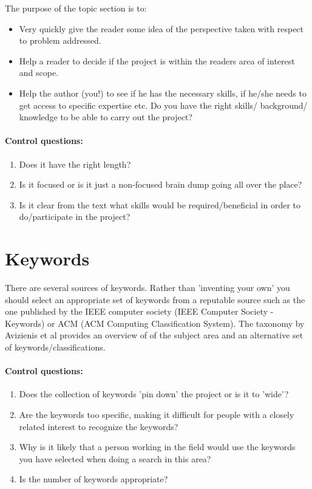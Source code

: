 \documentclass[gjovik]{gucmasterproject}
\begin{document}
The purpose of the topic section is to:
\begin{itemize}
\item Very quickly give the reader some idea of the perspective taken
with respect to problem addressed.  
\item Help a reader to decide if the project
is within the readers area of interest and scope.
\item Help the author (you!) to see if he has the necessary skills,
if he/she needs to get access to specific expertise etc.
Do you have the right skills/ background/ knowledge
to be able to carry out the project?
\end{itemize}

\paragraph{Control questions:}
\begin{enumerate}
\item Does it have the right length?
\item Is it focused or is it just a non-focused brain dump going all over the place?
\item Is it clear from the text what skills would be required/beneficial in order to do/participate in the project?
\end{enumerate}


\section{Keywords}
There are several sources of keywords. Rather than 'inventing your own' you should select an appropriate set of keywords from a reputable source such as the one published by the IEEE computer society (IEEE Computer Society - Keywords) or ACM (ACM Computing Classification System).
The taxonomy by Avizienis et al\cite{Avizienis2004} provides an overview of of the subject area and an alternative set of keywords/classifications.

\paragraph{Control questions:}
\begin{enumerate}
\item Does the collection of keywords 'pin down' the project or is it to 'wide'?
\item Are the keywords too specific, making it difficult  for people with a closely related interest to recognize the keywords?
\item Why is it likely that a person working in the field would use the keywords you have selected when doing a search in this area?
\item Is the number of keywords appropriate?
\end{enumerate}
\end{document}
